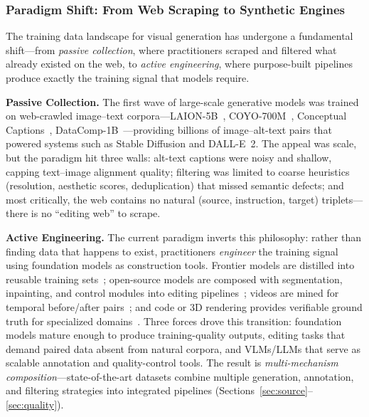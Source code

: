 \subsubsection{Paradigm Shift: From Web Scraping to Synthetic Engines}
\label{sec:paradigm}

The training data landscape for visual generation has undergone a fundamental shift---from \emph{passive collection}, where practitioners scraped and filtered what already existed on the web, to \emph{active engineering}, where purpose-built pipelines produce exactly the training signal that models require.

\textbf{Passive Collection.}
The first wave of large-scale generative models was trained on web-crawled image--text corpora---LAION-5B~\citep{schuhmann2022laion}, COYO-700M~\citep{kakaobrain2022coyo-700m}, Conceptual Captions~\citep{sharma2018conceptual}, DataComp-1B~\citep{gadre2023datacomp}---providing billions of image--alt-text pairs that powered systems such as Stable Diffusion and DALL-E~2. The appeal was scale, but the paradigm hit three walls: alt-text captions were noisy and shallow, capping text--image alignment quality; filtering was limited to coarse heuristics (resolution, aesthetic scores, deduplication) that missed semantic defects; and most critically, the web contains no natural (source, instruction, target) triplets---there is no ``editing web'' to scrape.

\textbf{Active Engineering.}
The current paradigm inverts this philosophy: rather than finding data that happens to exist, practitioners \emph{engineer} the training signal using foundation models as construction tools. Frontier models are distilled into reusable training sets~\citep{chen2025sharegpt, qian2025pico}; open-source models are composed with segmentation, inpainting, and control modules into editing pipelines~\citep{zhao2024ultraedit, ye2025imgedit, liu2025step1x}; videos are mined for temporal before/after pairs~\citep{chang2025bytemorph, zeng2025editworld}; and code or 3D rendering provides verifiable ground truth for specialized domains~\citep{zhuo2025factuality, kumari2025generating}. Three forces drove this transition: foundation models mature enough to produce training-quality outputs, editing tasks that demand paired data absent from natural corpora, and VLMs/LLMs that serve as scalable annotation and quality-control tools. The result is \emph{multi-mechanism composition}---state-of-the-art datasets combine multiple generation, annotation, and filtering strategies into integrated pipelines (Sections~\ref{sec:source}--\ref{sec:quality}).

